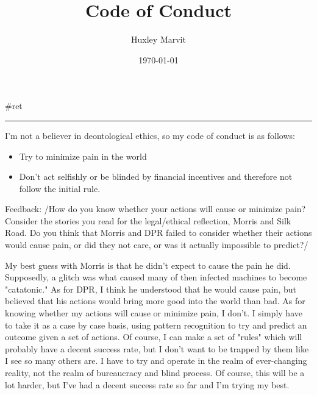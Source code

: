 \documentclass[letterpaper]{article}
\author{Huxley Marvit}
\date{\today}
\title{Code of Conduct}
\renewcommand{\tableofcontents}{}
\begin{document}
\tableofcontents

\#ret

\noindent\rule{\textwidth}{0.5pt}

I'm not a believer in deontological ethics, so my code of conduct is as
follows:

\begin{itemize}
\item Try to minimize pain in the world
\item Don't act selfishly or be blinded by financial incentives and
therefore not follow the initial rule.
\end{itemize}

Feedback: /How do you know whether your actions will cause or minimize
pain? Consider the stories you read for the legal/ethical reflection,
Morris and Silk Road. Do you think that Morris and DPR failed to
consider whether their actions would cause pain, or did they not care,
or was it actually impossible to predict?/

My best guess with Morris is that he didn't expect to cause the pain he
did. Supposedly, a glitch was what caused many of then infected machines
to become "catatonic." As for DPR, I think he understood that he would
cause pain, but believed that his actions would bring more good into the
world than bad. As for knowing whether my actions will cause or minimize
pain, I don't. I simply have to take it as a case by case basis, using
pattern recognition to try and predict an outcome given a set of
actions. Of course, I can make a set of "rules" which will probably have
a decent success rate, but I don't want to be trapped by them like I see
so many others are. I have to try and operate in the realm of
ever-changing reality, not the realm of bureaucracy and blind process.
Of course, this will be a lot harder, but I've had a decent success rate
so far and I'm trying my best.
\end{document}
